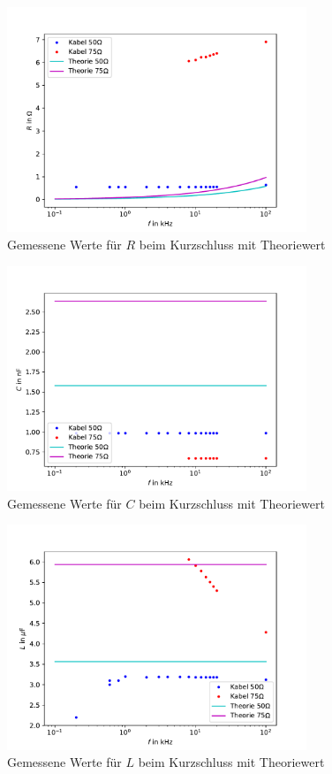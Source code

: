

\begin{figure}[h]
	\centering
	\includegraphics[width=0.8\textwidth]{RLC_DirekteMessung/build/PlotR.pdf}
	\caption[Werte für $R$]{Gemessene Werte für $R$ beim Kurzschluss mit Theoriewert}
	\label{fig:PlotR}
\end{figure}
\begin{figure}[h]
	\centering
	\includegraphics[width=0.8\textwidth]{RLC_DirekteMessung/build/PlotC.pdf}
	\caption[Werte für $C$]{Gemessene Werte für $C$ beim Kurzschluss mit Theoriewert}
	\label{fig:PlotC}
\end{figure}
\begin{figure}[h]
	\centering
	\includegraphics[width=0.8\textwidth]{RLC_DirekteMessung/build/PlotL.pdf}
	\caption[Werte für $L$]{Gemessene Werte für $L$ beim Kurzschluss mit Theoriewert}
	\label{fig:PlotL}
\end{figure}
